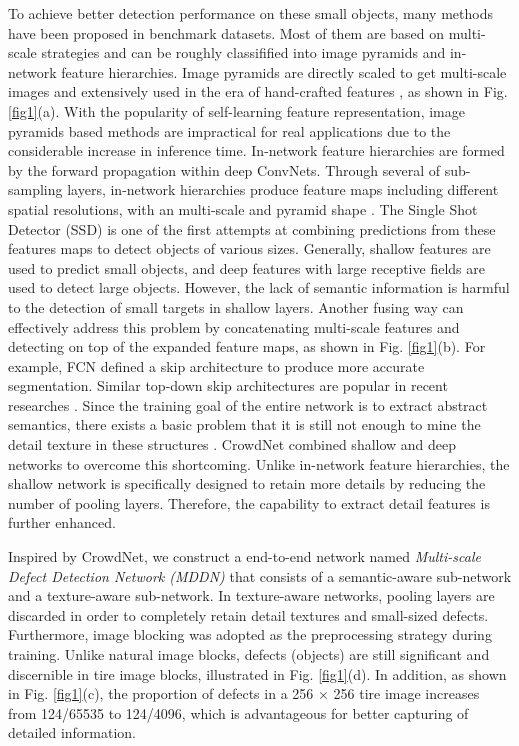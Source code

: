 \documentclass{article}
\begin{document}
To achieve better detection performance on these small objects, many methods have been proposed in benchmark datasets. Most of them are based on multi-scale strategies and can be roughly classifified into image pyramids and in-network feature hierarchies. Image pyramids are directly scaled to get multi-scale images and extensively used in the era of hand-crafted features \cite{lowe2004distinctive}, as shown in Fig. \ref{fig1}(a). With the popularity of self-learning feature representation, image pyramids based methods are impractical for real applications due to the considerable increase in inference time. In-network feature hierarchies are formed by the forward propagation within deep ConvNets. Through several of sub-sampling layers, in-network hierarchies produce feature maps including different spatial resolutions, with an multi-scale and pyramid shape \cite{lin2017feature}. The Single Shot Detector (SSD) \cite{liu2016ssd} is one of the first attempts at combining predictions from these features maps to detect objects of various sizes. Generally, shallow features are used to predict small objects, and deep features with large receptive fields are used to detect large objects. However, the lack of semantic information is harmful to the detection of small targets in shallow layers. Another fusing way can effectively address this problem by concatenating multi-scale features and detecting on top of the expanded feature maps, as shown in Fig. \ref{fig1}(b). For example, FCN defined a skip architecture to produce more accurate segmentation. Similar top-down skip architectures are popular in recent researches \cite{newell2016stacked,ghiasi2016laplacian}. Since the training goal of the entire network is to extract abstract semantics, there exists a basic problem that it is still not enough to mine the detail texture in these structures \cite{zhou2018scale}. CrowdNet \cite{boominathan2016crowdnet} combined shallow and deep networks to overcome this shortcoming. Unlike in-network feature hierarchies, the shallow network is specifically designed to retain more details by reducing the number of pooling layers. Therefore, the capability to extract detail features is further enhanced.

Inspired by CrowdNet, we construct a end-to-end network named {\it Multi-scale Defect Detection Network (MDDN)} that consists of a semantic-aware sub-network and a texture-aware sub-network. In texture-aware networks, pooling layers are discarded in order to completely retain detail textures and small-sized defects. Furthermore, image blocking \cite{boominathan2016crowdnet,bai2018sod} was adopted as the preprocessing strategy during training. Unlike natural image blocks, defects (objects) are still significant and discernible in tire image blocks, illustrated in Fig. \ref{fig1}(d). In addition, as shown in Fig. \ref{fig1}(c), the proportion of defects in a 256 $\times$ 256 tire image increases from 124/65535 to 124/4096, which is advantageous for better capturing of detailed information.
\end{document}
